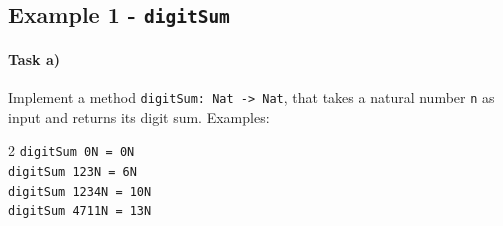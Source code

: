 \subsection{Example 1 - \texttt{digitSum}} %


\paragraph{Task a)} Implement a method \lstinline[basicstyle=\ttfamily]|digitSum: Nat -> Nat|,
that takes a natural number \lstinline[basicstyle=\ttfamily]|n| as input and returns its digit sum. Examples:
\begin{center}\begin{multicols}{2}
	\lstinline[basicstyle=\ttfamily]|digitSum 0N = 0N|\\
	\lstinline[basicstyle=\ttfamily]|digitSum 123N = 6N|\\
	\lstinline[basicstyle=\ttfamily]|digitSum 1234N = 10N|\\
	\lstinline[basicstyle=\ttfamily]|digitSum 4711N = 13N|
\end{multicols}\end{center}












